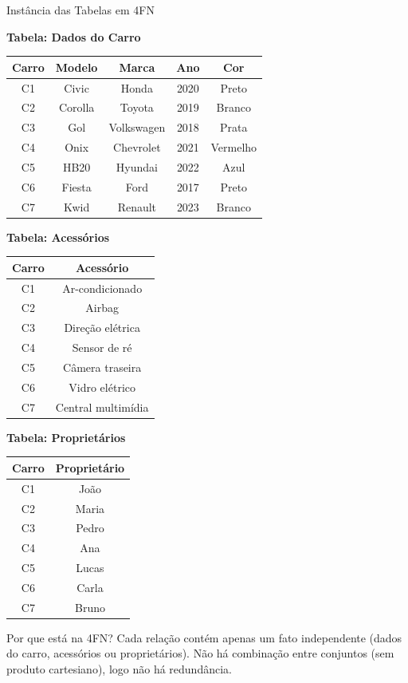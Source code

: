 \documentclass[9pt]{beamer}
\begin{document}
\begin{frame}{Instância das Tabelas em 4FN}
\scriptsize

\centering
\textbf{Tabela: Dados do Carro}
\begin{tabular}{|c|c|c|c|c|}
\hline
Carro & Modelo & Marca & Ano & Cor \\ \hline
C1 & Civic & Honda & 2020 & Preto \\ \hline
C2 & Corolla & Toyota & 2019 & Branco \\ \hline
C3 & Gol & Volkswagen & 2018 & Prata \\ \hline
C4 & Onix & Chevrolet & 2021 & Vermelho \\ \hline
C5 & HB20 & Hyundai & 2022 & Azul \\ \hline
C6 & Fiesta & Ford & 2017 & Preto \\ \hline
C7 & Kwid & Renault & 2023 & Branco \\ \hline
\end{tabular}

\vspace{0.3cm}

\textbf{Tabela: Acessórios}
\begin{tabular}{|c|c|}
\hline
Carro & Acessório \\ \hline
C1 & Ar-condicionado \\ \hline
C2 & Airbag \\ \hline
C3 & Direção elétrica \\ \hline
C4 & Sensor de ré \\ \hline
C5 & Câmera traseira \\ \hline
C6 & Vidro elétrico \\ \hline
C7 & Central multimídia \\ \hline
\end{tabular}

\vspace{0.3cm}

\textbf{Tabela: Proprietários}
\begin{tabular}{|c|c|}
\hline
Carro & Proprietário \\ \hline
C1 & João \\ \hline
C2 & Maria \\ \hline
C3 & Pedro \\ \hline
C4 & Ana \\ \hline
C5 & Lucas \\ \hline
C6 & Carla \\ \hline
C7 & Bruno \\ \hline
\end{tabular}

\begin{alertblock}{Por que está na 4FN?}
Cada relação contém apenas um fato independente (dados do carro, acessórios ou proprietários).  
Não há combinação entre conjuntos (sem produto cartesiano), logo não há redundância.
\end{alertblock}

\end{frame}
\end{document}
